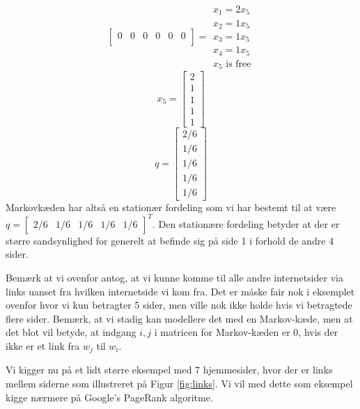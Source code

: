 \documentclass[10pt,a4paper]{article}
\begin{document}
\begin{enumerate}
\[\begin{bmatrix}
		0 & 0 & 0 & 0 & 0 & 0 \\
	\end{bmatrix} = \begin{matrix} x_1=2x_5 \\x_2=1x_5 \\x_3 =1x_5 \\ x_4=1x_5 \\x_5 \text{ is free} \end{matrix} \]
	\[ x_5= \begin{bmatrix}2 \\ 1 \\ 1 \\ 1 \\ 1 \end{bmatrix} \]
	\[q=\begin{bmatrix}2/6 \\ 1/6 \\ 1/6 \\ 1/6 \\ 1/6
\end{bmatrix}\]
	Markovkæden har altså en stationær fordeling som vi har bestemt til at være $q=\begin{bmatrix}2/6 & 1/6 & 1/6 & 1/6 & 1/6
\end{bmatrix}^T$. Den stationære fordeling betyder at der er større sandsynlighed for generelt at befinde sig på side 1 i forhold de andre 4 sider. 
\end{enumerate}

Bemærk at vi ovenfor antog, at vi kunne komme til alle andre internetsider via links uanset fra hvilken internetside vi kom fra. Det er måske fair nok i eksemplet ovenfor hvor vi kun betragter 5 sider, men ville nok ikke holde hvis vi betragtede flere sider. Bemærk, at vi stadig kan modellere det med en Markov-kæde, men at det blot vil betyde, at indgang $i,j$ i matricen for Markov-kæden er $0$, hvis der ikke er et link fra $w_j$ til $w_i$.

Vi kigger nu på et lidt større eksempel med $7$ hjemmesider, hvor der er links mellem siderne som illustreret på Figur \ref{fig:links}. Vi vil med dette som eksempel kigge nærmere på Google's PageRank algoritme.
\end{document}
